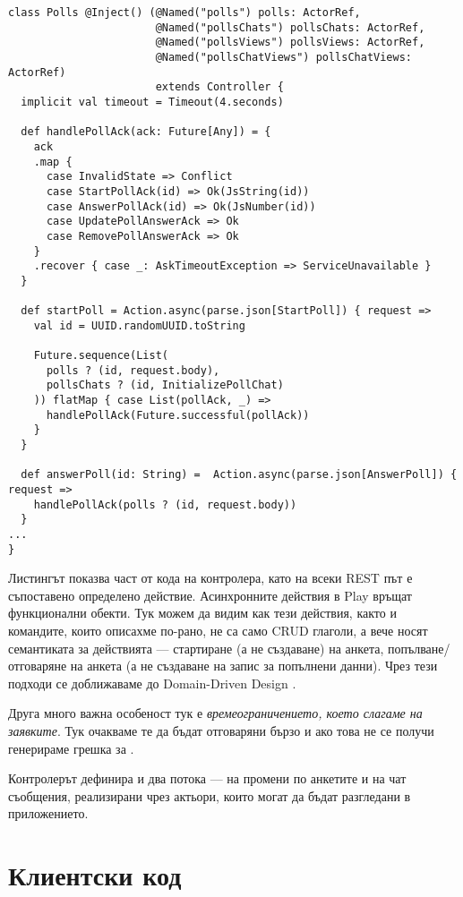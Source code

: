 \begin{lstlisting}
class Polls @Inject() (@Named("polls") polls: ActorRef,
                       @Named("pollsChats") pollsChats: ActorRef,
                       @Named("pollsViews") pollsViews: ActorRef,
                       @Named("pollsChatViews") pollsChatViews: ActorRef)
                       extends Controller {
  implicit val timeout = Timeout(4.seconds)
  
  def handlePollAck(ack: Future[Any]) = {
    ack
    .map {
      case InvalidState => Conflict
      case StartPollAck(id) => Ok(JsString(id))
      case AnswerPollAck(id) => Ok(JsNumber(id))
      case UpdatePollAnswerAck => Ok
      case RemovePollAnswerAck => Ok
    }
    .recover { case _: AskTimeoutException => ServiceUnavailable }
  }
  
  def startPoll = Action.async(parse.json[StartPoll]) { request =>
    val id = UUID.randomUUID.toString
    
    Future.sequence(List(
      polls ? (id, request.body),
      pollsChats ? (id, InitializePollChat)
    )) flatMap { case List(pollAck, _) =>
      handlePollAck(Future.successful(pollAck))
    }
  }
  
  def answerPoll(id: String) =  Action.async(parse.json[AnswerPoll]) { request =>
    handlePollAck(polls ? (id, request.body))
  }
...
}
\end{lstlisting}

Листингът показва част от кода на  контролера, като на всеки REST път е съпоставено определено действие. Асинхронните действия в Play връщат функционални  обекти. Тук можем да видим как тези действия, както и командите, които описахме по-рано, не са само CRUD глаголи, а вече носят семантиката за действията — стартиране (а не създаване) на анкета, попълване/отговаряне на анкета (а не създаване на запис за попълнени данни). Чрез тези подходи се доближаваме до Domain-Driven Design \cite{evans2003DDD}.

Друга много важна особеност тук е \emph{времеограничението, което слагаме на заявките}. Тук очакваме те да бъдат отговаряни бързо и ако това не се получи генерираме грешка за .

Контролерът дефинира и два потока — на промени по анкетите и на чат съобщения, реализирани чрез актьори, които могат да бъдат разгледани в приложението.

\section{Клиентски код}

